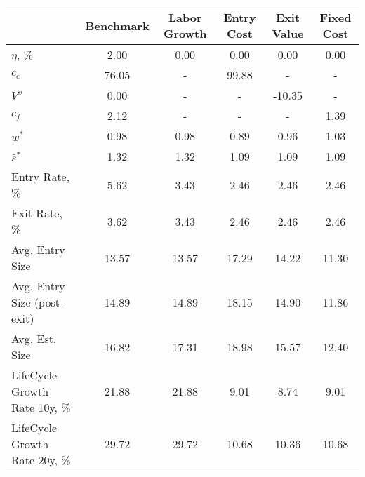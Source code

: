 \begin{tabular}{lccccc}
\toprule
{} & Benchmark & Labor Growth & Entry Cost & Exit Value & Fixed Cost \\
\midrule
$\eta$, \%                    &      2.00 &         0.00 &       0.00 &       0.00 &       0.00 \\
$c_e$                         &     76.05 &            - &      99.88 &          - &          - \\
$V^x$                         &      0.00 &            - &          - &     -10.35 &          - \\
$c_f$                         &      2.12 &            - &          - &          - &       1.39 \\
$w^*$                         &      0.98 &         0.98 &       0.89 &       0.96 &       1.03 \\
$\bar{s}^*$                   &      1.32 &         1.32 &       1.09 &       1.09 &       1.09 \\
Entry Rate, \%                &      5.62 &         3.43 &       2.46 &       2.46 &       2.46 \\
Exit Rate, \%                 &      3.62 &         3.43 &       2.46 &       2.46 &       2.46 \\
Avg. Entry Size               &     13.57 &        13.57 &      17.29 &      14.22 &      11.30 \\
Avg. Entry Size (post-exit)   &     14.89 &        14.89 &      18.15 &      14.90 &      11.86 \\
Avg. Est. Size                &     16.82 &        17.31 &      18.98 &      15.57 &      12.40 \\
LifeCycle Growth Rate 10y, \% &     21.88 &        21.88 &       9.01 &       8.74 &       9.01 \\
LifeCycle Growth Rate 20y, \% &     29.72 &        29.72 &      10.68 &      10.36 &      10.68 \\
\bottomrule
\end{tabular}
